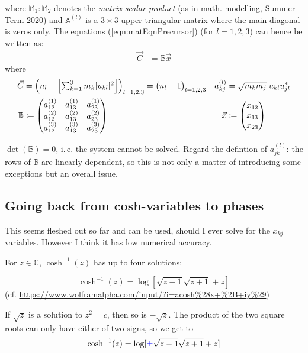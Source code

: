 \documentclass[
	english,
	a4paper,
	fontsize=10pt,
	parskip=half,
	titlepage=true,
	DIV=12,
	final
]{scrreprt}
\newcommand*{\ie}{i.\,e.\xspace}
\newcommand*{\setComplex}  {\ensuremath{\mathds{C}}}
\begin{document}
where $\mathbb{M}_1 : \mathbb{M}_2$ denotes the \emph{matrix scalar product} (as in math. modelling, Summer Term 2020) and $\mathbb{A}^{(l)}$ is a $3 \times 3$ upper triangular matrix where the main diagonal is zeros only. The equations (\ref{eqn:matEqnPrecursor}) (for $l = 1, 2, 3$) can hence be written as:
\begin{align}
	\vec{C}
&=
	\mathbb{B} \vec{x}
\end{align}
where
\begin{align*}
	\vec{C}
&=
	\mqty(n_l - \qty[
		\sum_{k=1}^3
			m_k
			|u_{kl}|^2
	])_{l=1,2,3}
=
	\mqty( \big. n_l - 1)_{l=1,2,3}
&
	a^{(l)}_{kj}
&=
	\sqrt{m_k m_j}  \; u_{kl} u_{jl}^*
\\
	\mathbb{B}
&\coloneqq
	\mqty(
		a^{(1)}_{12} & a^{(1)}_{13} & a^{(1)}_{23} \\
		a^{(2)}_{12} & a^{(2)}_{13} & a^{(2)}_{23} \\
		a^{(3)}_{12} & a^{(3)}_{13} & a^{(3)}_{23}
	)
&
	\vec{x}
&\coloneqq
	\mqty(x_{12} \\ x_{13} \\ x_{23})
\end{align*}

{\color{red}
$\det(\mathbb{B}) = 0$, \ie the system cannot be solved. Regard the defintion of $a_{jk}^{(l)}$: the rows of $\mathbb{B}$ are linearly dependent, so this is not only a matter of introducing some exceptions but an overall issue.
}

\subsection{Going back from cosh-variables to phases}
{\color{blue} This seems fleshed out so far and can be used, should I ever solve for the $x_{kj}$ variables. However I think it has low numerical accuracy.}

For $z \in \setComplex$, $\cosh^{-1}(z)$ has up to four solutions:

\begin{equation}
	\cosh^{-1}(z) = \log[ \sqrt{z - 1} \sqrt{z + 1} + z ]
\end{equation}
(cf. \url{https://www.wolframalpha.com/input/?i=acosh%28x+%2B+iy%29})

If $\sqrt{z}$ is a solution to $z^2 = c$, then so is $-\sqrt{z}$. The product of the two square roots can only have either of two signs, so we get to
\begin{equation}
	\cosh^{-1}(z) = \log[ {\color{blue}\pm} \sqrt{z - 1} \sqrt{z + 1} + z ]
\end{equation}
\end{document}
